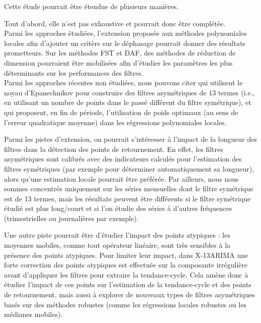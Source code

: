 \documentclass[
  12pt,
  a4paper,french]{article}
\newcommand\1{\mathds{1}}
\begin{document}
Cette étude pourrait être étendue de plusieurs manières.

Tout d'abord, elle n'est pas exhaustive et pourrait donc être complétée.\\
Parmi les approches étudiées, l'extension proposée aux méthodes polynomiales locales afin d'ajouter un critère sur le déphasage pourrait donner des résultats prometteurs.
Sur les méthodes FST et DAF, des méthodes de réduction de dimension pourraient être mobilisées afin d'étudier les paramètres les plus déterminants sur les performances des filtres.\\
Parmi les approches récentes non étudiées, nous pouvons citer \textcite{vasyechko2014new} qui utilisent le noyau d'Epanechnikov pour construire des filtres asymétriques de 13 termes (i.e., en utilisant un nombre de points dans le passé différent du filtre symétrique), et \textcite{FengSchafer2021} qui proposent, en fin de période, l'utilisation de poids optimaux (au sens de l'erreur quadratique moyenne) dans les régressions polynomiales locales.

Parmi les pistes d'extension, on pourrait s'intéresser à l'impact de la longueur des filtres dans la détection des points de retournement.
En effet, les filtres asymétriques sont calibrés avec des indicateurs calculés pour l'estimation des filtres symétriques (par exemple pour déterminer automatiquement sa longueur), alors qu'une estimation locale pourrait être préférée.
Par ailleurs, nous nous sommes concentrés uniquement sur les séries mensuelles dont le filtre symétrique est de 13 termes, mais les résultats peuvent être différents si le filtre symétrique étudié est plus long/court et si l'on étudie des séries à d'autres fréquences (trimestrielles ou journalières par exemple).

Une autre piste pourrait être d'étudier l'impact des points atypiques : les moyennes mobiles, comme tout opérateur linéaire, sont très sensibles à la présence des points atypiques.
Pour limiter leur impact, dans X-13ARIMA une forte correction des points atypiques est effectuée sur la composante irrégulière avant d'appliquer les filtres pour extraire la tendance-cycle.
Cela amène donc à étudier l'impact de ces points sur l'estimation de la tendance-cycle et des points de retournement, mais aussi à explorer de nouveaux types de filtres asymétriques basés sur des méthodes robustes (comme les régressions locales robustes ou les médianes mobiles).

\newpage

\hypertarget{appendix-annexe}{%
\appendix}
\end{document}
